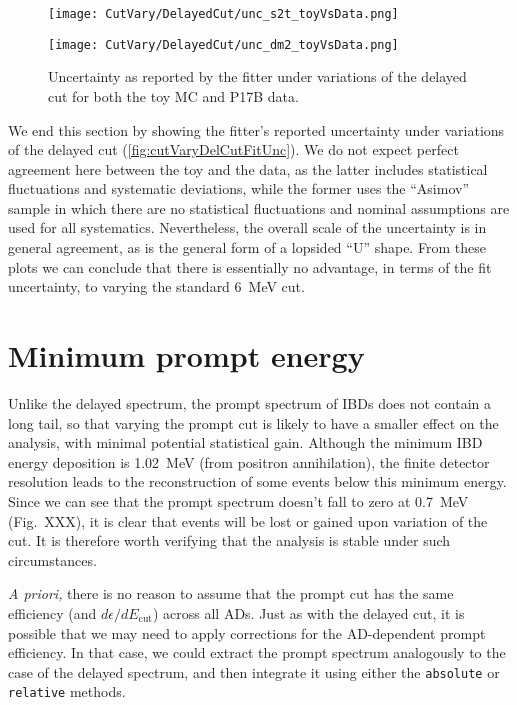 \documentclass[../thesis.tex]{subfiles}
\begin{document}
\begin{figure}[ht]
  \begin{minipage}{0.5\linewidth}%
    \texttt{[image: CutVary/DelayedCut/unc\_s2t\_toyVsData.png]}%
  \end{minipage}%
  \begin{minipage}{0.5\linewidth}%
    \texttt{[image: CutVary/DelayedCut/unc\_dm2\_toyVsData.png]}%
  \end{minipage}%
  \caption{Uncertainty as reported by the fitter under variations of the delayed cut for both the toy MC and P17B data.}
  \label{fig:cutVaryDelCutFitUnc}
\end{figure}

We end this section by showing the fitter's reported uncertainty under variations of the delayed cut (\autoref{fig:cutVaryDelCutFitUnc}). We do not expect perfect agreement here between the toy and the data, as the latter includes statistical fluctuations and systematic deviations, while the former uses the ``Asimov'' sample in which there are no statistical fluctuations and nominal assumptions are used for all systematics. Nevertheless, the overall scale of the uncertainty is in general agreement, as is the general form of a lopsided ``U'' shape. From these plots we can conclude that there is essentially no advantage, in terms of the fit uncertainty, to varying the standard 6~MeV cut.

\section{Minimum prompt energy}
\label{sec:cutVaryMinPrompt}

Unlike the delayed spectrum, the prompt spectrum of IBDs does not contain a long tail, so that varying the prompt cut is likely to have a smaller effect on the analysis, with minimal potential statistical gain. Although the minimum IBD energy deposition is 1.02~MeV (from positron annihilation), the finite detector resolution leads to the reconstruction of some events below this minimum energy. Since we can see that the prompt spectrum doesn't fall to zero at 0.7~MeV (Fig.~XXX), it is clear that events will be lost or gained upon variation of the cut. It is therefore worth verifying that the analysis is stable under such circumstances.

\emph{A priori,} there is no reason to assume that the prompt cut has the same efficiency (and $d\epsilon/dE_{\mathrm{cut}}$) across all ADs. Just as with the delayed cut, it is possible that we may need to apply corrections for the AD-dependent prompt efficiency. In that case, we could extract the prompt spectrum analogously to the case of the delayed spectrum, and then integrate it using either the \texttt{absolute} or \texttt{relative} methods.
\end{document}
